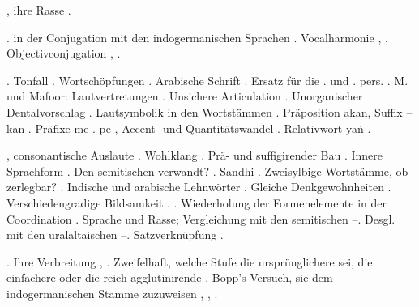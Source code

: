 \begin{register}

, ihre Rasse \pageref{sp.147}. 

.  in der Conjugation mit den indogermanischen Sprachen \pageref{sp.153}. Vocalharmonie \pageref{sp.350}, \pageref{sp.403}. Objectivconjugation \pageref{sp.384}, \pageref{sp.391}. 


. Tonfall \pageref{sp.34}. Wortschöpfungen \pageref{sp.42}. Arabische Schrift \pageref{sp.129}. Ersatz für die  \pageref{sp.1}. und \pageref{sp.2}. pers. \pageref{sp.152}. M. und Mafoor: Lautvertretungen \pageref{sp.158}. Unsichere Articulation \pageref{sp.193}. Unorganischer Dentalvorschlag \pageref{sp.201}. Lautsymbolik in den Wortstämmen \pageref{sp.223}. Präposition akan, Suffix –kan \pageref{sp.348}. Präfixe me-. pe-, Accent- und Quantitätswandel \pageref{sp.350}. Relativwort yaṅ \pageref{sp.457}.

, consonantische Auslaute \pageref{sp.29}. Wohlklang \pageref{sp.34}.   Prä- und suffigirender Bau \pageref{sp.149}. Innere Sprachform \pageref{sp.150}. Den semitischen verwandt? \pageref{sp.162}. Sandhi \pageref{sp.199}. Zweisylbige Wortstämme, ob zerlegbar? \pageref{sp.242}. Indische und arabische Lehnwörter \pageref{sp.266}. Gleiche Denkgewohnheiten \pageref{sp.293}. Verschiedengradige Bildsamkeit \pageref{sp.349}.  \pageref{sp.384}. Wiederholung der Formenelemente in der Coordination \pageref{sp.400}. Sprache und Rasse; Vergleichung mit den semitischen \pageref{sp.411}–\pageref{sp.415}. Desgl. mit den uralaltaischen \pageref{sp.415}–\pageref{sp.420}. Satzverknüpfung \pageref{sp.465}.

. Ihre Verbreitung \pageref{sp.142}, \pageref{sp.147}. Zweifelhaft, welche Stufe die ursprünglichere sei, die einfachere oder die reich agglutinirende \pageref{sp.257}. Bopp’s Versuch, sie dem indogermanischen Stamme zuzuweisen \pageref{sp.144}, \pageref{sp.155}, \pageref{sp.266}.


\end{register}
